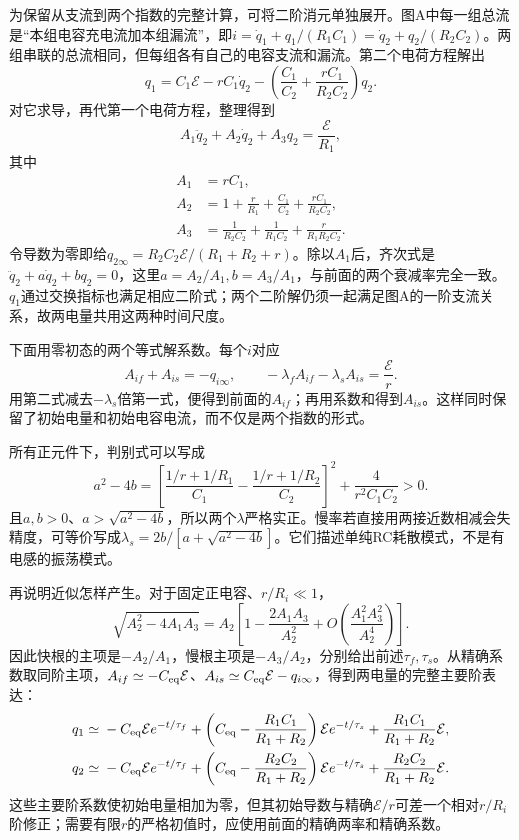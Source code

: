 \documentclass[UTF8,fontset=fandol,a4paper,11pt]{ctexart}
\begin{document}
为保留从支流到两个指数的完整计算，可将二阶消元单独展开。图A中每一组总流是“本组电容充电流加本组漏流”，即$i=\dot q_1+q_1/(R_1C_1)=\dot q_2+q_2/(R_2C_2)$。两组串联的总流相同，但每组各有自己的电容支流和漏流。第二个电荷方程解出
\[
q_1=C_1\mathcal E-rC_1\dot q_2
-\left(\frac{C_1}{C_2}+\frac{rC_1}{R_2C_2}\right)q_2.
\]
对它求导，再代第一个电荷方程，整理得到
\[
A_1\ddot q_2+A_2\dot q_2+A_3q_2=\frac{\mathcal E}{R_1},
\]
其中
\[
\begin{aligned}
A_1&=rC_1,\\
A_2&=1+\frac r{R_1}+\frac{C_1}{C_2}
+\frac{rC_1}{R_2C_2},\\
A_3&=\frac1{R_2C_2}+\frac1{R_1C_2}
+\frac r{R_1R_2C_2}.
\end{aligned}
\]
令导数为零即给$q_{2\infty}=R_2C_2\mathcal E/(R_1+R_2+r)$。除以$A_1$后，齐次式是$\ddot q_2+a\dot q_2+bq_2=0$，这里$a=A_2/A_1,b=A_3/A_1$，与前面的两个衰减率完全一致。$q_1$通过交换指标也满足相应二阶式；两个二阶解仍须一起满足图A的一阶支流关系，故两电量共用这两种时间尺度。

下面用零初态的两个等式解系数。每个$i$对应
\[
A_{if}+A_{is}=-q_{i\infty},\qquad
-\lambda_f A_{if}-\lambda_s A_{is}=\frac{\mathcal E}{r}.
\]
用第二式减去$-\lambda_s$倍第一式，便得到前面的$A_{if}$；再用系数和得到$A_{is}$。这样同时保留了初始电量和初始电容电流，而不仅是两个指数的形式。

所有正元件下，判别式可以写成
\[
a^2-4b=
\left[\frac{1/r+1/R_1}{C_1}
-\frac{1/r+1/R_2}{C_2}\right]^2
+\frac4{r^2C_1C_2}>0.
\]
且$a,b>0$、$a>\sqrt{a^2-4b}$，所以两个$\lambda$严格实正。慢率若直接用两接近数相减会失精度，可等价写成$\lambda_s=2b/[a+\sqrt{a^2-4b}]$。它们描述单纯RC耗散模式，不是有电感的振荡模式。

再说明近似怎样产生。对于固定正电容、$r/R_i\ll1$，
\[
\sqrt{A_2^2-4A_1A_3}
=A_2\left[1-\frac{2A_1A_3}{A_2^2}
+O\!\left(\frac{A_1^2A_3^2}{A_2^4}\right)\right].
\]
因此快根的主项是$-A_2/A_1$，慢根主项是$-A_3/A_2$，分别给出前述$\tau_f,\tau_s$。从精确系数取同阶主项，$A_{if}\simeq-C_{\rm eq}\mathcal E$、$A_{is}\simeq C_{\rm eq}\mathcal E-q_{i\infty}$，得到两电量的完整主要阶表达：
\[
\begin{aligned}
q_1\simeq{}&-C_{\rm eq}\mathcal E e^{-t/\tau_f}
+\left(C_{\rm eq}-\frac{R_1C_1}{R_1+R_2}\right)
 \mathcal E e^{-t/\tau_s}
+\frac{R_1C_1}{R_1+R_2}\mathcal E,\\
q_2\simeq{}&-C_{\rm eq}\mathcal E e^{-t/\tau_f}
+\left(C_{\rm eq}-\frac{R_2C_2}{R_1+R_2}\right)
 \mathcal E e^{-t/\tau_s}
+\frac{R_2C_2}{R_1+R_2}\mathcal E.
\end{aligned}
\]
这些主要阶系数使初始电量相加为零，但其初始导数与精确$\mathcal E/r$可差一个相对$r/R_i$阶修正；需要有限$r$的严格初值时，应使用前面的精确两率和精确系数。
\end{document}
